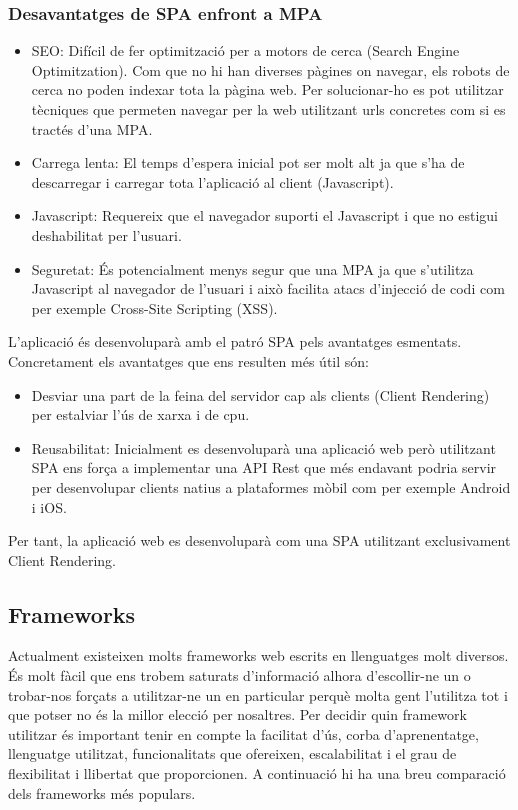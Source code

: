 \documentclass[12pt, titlepage]{article}
\begin{document}
\subsubsection{Desavantatges de SPA enfront a MPA}
\begin{itemize}
\item SEO: Difícil de fer optimització per a motors de cerca (Search Engine Optimitzation).
Com que no hi han diverses pàgines on navegar, els robots de cerca no poden indexar
tota la pàgina web. Per solucionar-ho es pot utilitzar tècniques que permeten navegar
per la web utilitzant urls concretes com si es tractés d’una MPA.

\item Carrega lenta: El temps d’espera inicial pot ser molt alt ja que s’ha de
descarregar i carregar tota l’aplicació al client (Javascript).

\item Javascript: Requereix que el navegador suporti el Javascript i que no estigui
deshabilitat per l’usuari.

\item Seguretat: És potencialment menys segur que una MPA ja que s’utilitza
Javascript al navegador de l’usuari i això facilita atacs d’injecció de codi com
per exemple Cross-Site Scripting (XSS).
\end{itemize}

L’aplicació és desenvoluparà amb el patró SPA pels avantatges esmentats. Concretament
els avantatges que ens resulten més útil són:
\begin{itemize}
\item Desviar una part de la feina del servidor cap als clients (Client Rendering)
per estalviar l’ús de xarxa i de cpu.

\item Reusabilitat: Inicialment es desenvoluparà una aplicació web però utilitzant
SPA ens força a implementar una API Rest que més endavant podria servir per
desenvolupar clients natius a plataformes mòbil com per exemple Android i iOS.
\end{itemize}

Per tant, la aplicació web es desenvoluparà com una SPA utilitzant exclusivament Client Rendering.

\subsection{Frameworks}
Actualment existeixen molts frameworks web escrits en llenguatges molt diversos.
És molt fàcil que ens trobem saturats d’informació alhora d’escollir-ne un o
trobar-nos forçats a utilitzar-ne un en particular perquè molta gent l’utilitza
tot i que potser no és la millor elecció per nosaltres. Per decidir quin framework
utilitzar és important tenir en compte la facilitat d’ús, corba d’aprenentatge,
llenguatge utilitzat, funcionalitats que ofereixen, escalabilitat i el grau de
flexibilitat i llibertat que proporcionen. A continuació hi ha una breu comparació
dels frameworks més populars.
\end{document}
